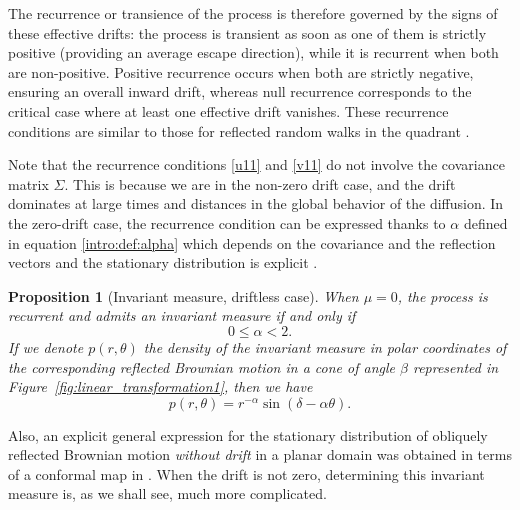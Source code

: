 \documentclass[11pt]{article}
\newcommand{\citet}[2][]{%
  \if\relax\detokenize{#1}\relax
    \cite{#2}%
  \else
    \cite[#1]{#2}%
  \fi
}
\newtheorem{prop}[thm]{Proposition}
\theoremstyle{definition}
\newtheorem{remarque}[thm]{Remark}
\begin{document}
The recurrence or transience of the process is therefore governed by the signs of these effective drifts: the process is transient as soon as one of them is strictly positive (providing an average escape direction), while it is recurrent when both are non-positive. Positive recurrence occurs when both are strictly negative, ensuring an overall inward drift, whereas null recurrence corresponds to the critical case where at least one effective drift vanishes.
These recurrence conditions are similar to those for reflected random walks in the quadrant \cite{fayolle_random_2017}.





Note that the recurrence conditions \eqref{u11} and \eqref{v11} do not involve the covariance matrix $\Sigma$. This is because we are in the non-zero drift case, and the drift dominates at large times and distances in the global behavior of the diffusion. In the zero-drift case, the recurrence condition can be expressed thanks to $\alpha$ defined in equation \eqref{intro:def:alpha} which depends on the covariance and the reflection vectors and the stationary distribution is explicit \citet{williams_recurrence_1985}.
\begin{prop}[Invariant measure, driftless case]
When $\mu=0$, the process is recurrent and admits an invariant measure if and only if $$0 \leqslant \alpha<2.$$%
If we denote $p(r,\theta)$ the density of the invariant measure in polar coordinates of the corresponding reflected Brownian motion in a cone of angle $\beta$ represented in Figure~\ref{fig:linear_transformation1}, then %
we have $$p(r,\theta)=r^{-\alpha}\sin (\delta-\alpha\theta).$$
\end{prop}
Also, an explicit general expression for the stationary distribution of obliquely reflected Brownian motion \emph{without drift} in a planar domain was obtained in terms of a conformal map in \cite{harrison_landau_shepp_1985}.
When the drift is not zero, determining this invariant measure is, as we shall see, much more complicated.
\end{document}
